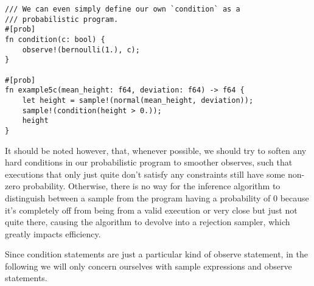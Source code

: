 \begin{minipage}{\linewidth}
\begin{lstlisting}
/// We can even simply define our own `condition` as a
/// probabilistic program.
#[prob]
fn condition(c: bool) {
    observe!(bernoulli(1.), c);
}

#[prob]
fn example5c(mean_height: f64, deviation: f64) -> f64 {
    let height = sample!(normal(mean_height, deviation));
    sample!(condition(height > 0.));
    height
}
\end{lstlisting}
\end{minipage}

It should be noted however, that, whenever possible, we should try to soften any hard conditions in our probabilistic program to smoother observes, such that executions that only just quite don't satisfy any constraints still have some non-zero probability. Otherwise, there is no way for the inference algorithm to distinguish between a sample from the program having a probability of $0$ because it's completely off from being from a valid execution or very close but just not quite there, causing the algorithm to devolve into a rejection sampler, which greatly impacts efficiency.

Since condition statements are just a particular kind of observe statement, in the following we will only concern ourselves with sample expressions and observe statements.
